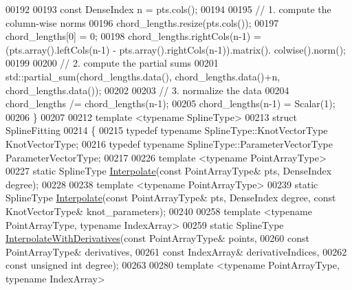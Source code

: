 \begin{DoxyCode}
00192 
00193     \textcolor{keyword}{const} DenseIndex n = pts.cols();
00194 
00195     \textcolor{comment}{// 1. compute the column-wise norms}
00196     chord\_lengths.resize(pts.cols());
00197     chord\_lengths[0] = 0;
00198     chord\_lengths.rightCols(n-1) = (pts.array().leftCols(n-1) - pts.array().rightCols(n-1)).matrix().
      colwise().norm();
00199 
00200     \textcolor{comment}{// 2. compute the partial sums}
00201     std::partial\_sum(chord\_lengths.data(), chord\_lengths.data()+n, chord\_lengths.data());
00202 
00203     \textcolor{comment}{// 3. normalize the data}
00204     chord\_lengths /= chord\_lengths(n-1);
00205     chord\_lengths(n-1) = Scalar(1);
00206   \}
00207 
00212   \textcolor{keyword}{template} <\textcolor{keyword}{typename} SplineType>
00213   \textcolor{keyword}{struct }SplineFitting
00214   \{
00215     \textcolor{keyword}{typedef} \textcolor{keyword}{typename} SplineType::KnotVectorType KnotVectorType;
00216     \textcolor{keyword}{typedef} \textcolor{keyword}{typename} SplineType::ParameterVectorType ParameterVectorType;
00217 
00226     \textcolor{keyword}{template} <\textcolor{keyword}{typename} Po\textcolor{keywordtype}{int}ArrayType>
00227     \textcolor{keyword}{static} SplineType \hyperlink{group___splines___module_adc80b6f0dd0dbbea28130fb254626874}{Interpolate}(\textcolor{keyword}{const} PointArrayType& pts, DenseIndex degree);
00228 
00238     \textcolor{keyword}{template} <\textcolor{keyword}{typename} Po\textcolor{keywordtype}{int}ArrayType>
00239     \textcolor{keyword}{static} SplineType \hyperlink{group___splines___module_adc80b6f0dd0dbbea28130fb254626874}{Interpolate}(\textcolor{keyword}{const} PointArrayType& pts, DenseIndex degree, \textcolor{keyword}{const} 
      KnotVectorType& knot\_parameters);
00240 
00258     \textcolor{keyword}{template} <\textcolor{keyword}{typename} Po\textcolor{keywordtype}{int}ArrayType, \textcolor{keyword}{typename} IndexArray>
00259     \textcolor{keyword}{static} SplineType \hyperlink{group___splines___module_a7bd937fdcfa168dbdc27932886a4da9f}{InterpolateWithDerivatives}(\textcolor{keyword}{const} PointArrayType& points,
00260                                                  \textcolor{keyword}{const} PointArrayType& derivatives,
00261                                                  \textcolor{keyword}{const} IndexArray& derivativeIndices,
00262                                                  \textcolor{keyword}{const} \textcolor{keywordtype}{unsigned} \textcolor{keywordtype}{int} degree);
00263 
00280     \textcolor{keyword}{template} <\textcolor{keyword}{typename} Po\textcolor{keywordtype}{int}ArrayType, \textcolor{keyword}{typename} IndexArray>

\end{DoxyCode}
